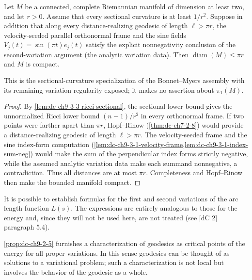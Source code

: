 \begin{lemma}
  \label{lem:dc-ch9-3-3-sectional-analytic}


  Let $M$ be a connected, complete Riemannian manifold of dimension at least two, and let
  $r>0$. Assume that every sectional curvature is at least $1/r^2$. Suppose in addition that
  along every distance-realizing geodesic of length $\ell>\pi r$, the velocity-seeded parallel
  orthonormal frame and the sine fields $V_j(t)=\sin(\pi t)e_j(t)$ satisfy the explicit
  nonnegativity conclusion of the second-variation argument (the analytic variation data).
  Then $\operatorname{diam}(M)\le\pi r$ and $M$ is compact.

  This is the sectional-curvature specialization of the Bonnet--Myers assembly with its
  remaining variation regularity exposed; it makes no assertion about $\pi_1(M)$.
\end{lemma}
\begin{proof}

  By \cref{lem:dc-ch9-3-3-ricci-sectional}, the sectional lower bound gives the unnormalized
  Ricci lower bound $(n-1)/r^2$ in every orthonormal frame. If two points were farther apart
  than $\pi r$, Hopf--Rinow (\cref{thm:dc-ch7-2-8}) would provide a distance-realizing geodesic
  of length $\ell>\pi r$. The velocity-seeded frame and the sine index-form computation
  (\cref{lem:dc-ch9-3-1-velocity-frame,lem:dc-ch9-3-1-index-sum-neg}) would make the sum of
  the perpendicular index forms strictly negative, while the assumed analytic variation data
  make each summand nonnegative, a contradiction. Thus all distances are at most $\pi r$.
  Completeness and Hopf--Rinow then make the bounded manifold compact.
\end{proof}

\begin{remark}[Remark 2.11]
  \label{rem:dc-ch9-2-11}
  It is possible to establish formulas for the first and second variations of the
  arc length function $L(s)$. The expressions are entirely analogous to those for the
  energy and, since they will not be used here, are not treated (see [dC 2]
  paragraph 5.4).
\end{remark}

\begin{remark}[Remark 2.6]
  \label{rem:dc-ch9-2-6}
  \cref{prop:dc-ch9-2-5} furnishes a characterization of geodesics as critical points of
  the energy for all proper variations. In this sense geodesics can be thought of as
  solutions to a variational problem; such a characterization is not local but
  involves the behavior of the geodesic as a whole.
\end{remark}

